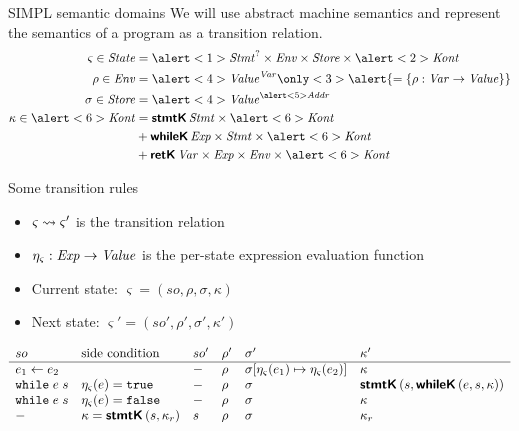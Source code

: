 \documentclass[aspectratio=169,notes]{beamer}
\begin{document}
\begin{frame}{SIMPL semantic domains}
  \begingroup\footnotesize We will use abstract machine semantics and represent the semantics of a program as a transition relation.\endgroup
\begin{align*}
    \varsigma \in \State & = \alert<1>{\Stmt^? \times \Env \times \Store \times \alert<2>{\Kont}} \\
    \rho \in \Env & = \alert<4>{\Value}^{\Var} \only<3>{\alert{= \Set{\rho : \Var \to \Value}}} \\
    \sigma \in \Store & = \alert<4>{\Value}^{\alert<5>{\Addr}} \\
    \kappa \in \alert<6>{\Kont} & = \sTag{stmtK}{\Stmt \times \alert<6>{\Kont}} \\
                         & \disunion \sTag{whileK}{\Exp \times \Stmt \times \alert<6>{\Kont}} \\
                         & \disunion \sTag{retK}{\Var \times \Exp \times \Env \times \alert<6>{\Kont}}
\end{align*}

\end{frame}

\begin{frame}{Some transition rules}
  \small
  \begin{itemize}
  \item $\varsigma \rightsquigarrow \varsigma'$ is the transition relation%
  \item \(\eta_\varsigma : \mathit{Exp} \to \mathit{Value} \) is the per-state expression evaluation function
\item Current state: \(\varsigma = (so, \rho, \sigma, \kappa) \)
\item Next state: \( \varsigma' = (so', \rho', \sigma', \kappa') \) \pause
  \end{itemize}
  \footnotesize
  \[
  \begin{array}{llllll}
    so & \text{side condition} & so' & \rho' & \sigma' & {\kappa}' \\ \hline
    e_1 \leftarrow e_2 & & - & \rho & \sigma[\eta_\varsigma(e_1) \mapsto \eta_\varsigma(e_2)] & {\kappa} \\
    \texttt{while}\; e\; s & \eta_\varsigma(e) = \texttt{true} & - & \rho & \sigma & \textsf{\textbf{stmtK}}\,(s, \textsf{\textbf{whileK}}\,(e, s,\kappa)) \\
    \texttt{while}\; e\; s & \eta_\varsigma(e) = \texttt{false} & - & \rho & \sigma & {\kappa} \\
    - & \kappa = \textsf{\textbf{stmtK}}\,(s,\kappa_r) & s & \rho & \sigma & {\kappa_r}
  \end{array}
  \]
\end{frame}
\end{document}
